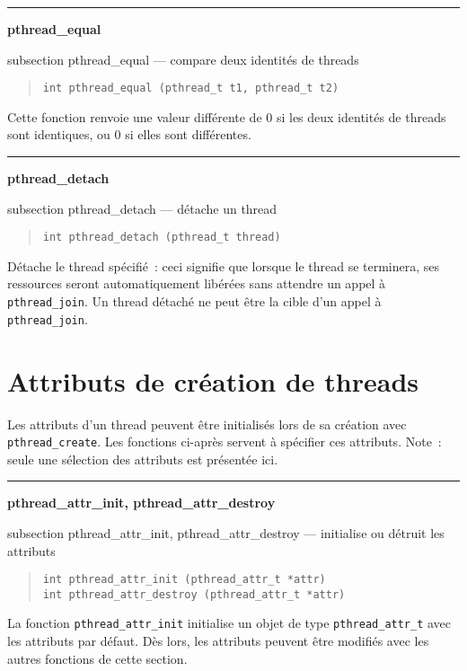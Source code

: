 \documentclass [twoside] {report}
\newcommand {\primitive} [1]
    {
	{\large \bf #1}
	\addcontentsline {toc} {subsection} {#1}
    }
\newcommand {\separation}
    {
	\vspace {7mm}
	\nopagebreak
	\hrule
    }
\begin{document}
\separation 
\primitive {pthread\_equal} --- compare deux identités de threads

\begin {quote}
\begin {verbatim}
int pthread_equal (pthread_t t1, pthread_t t2)
\end{verbatim}
\end {quote}

Cette fonction renvoie une valeur différente de 0 si les deux identités
de threads sont identiques, ou 0 si elles sont différentes.


\separation 
\primitive {pthread\_detach} --- détache un thread

\begin {quote}
\begin {verbatim}
int pthread_detach (pthread_t thread)
\end{verbatim}
\end {quote}

Détache le thread spécifié~: ceci signifie que lorsque le thread se
terminera, ses ressources seront automatiquement libérées sans attendre
un appel à \verb|pthread_join|. Un thread détaché ne peut être la
cible d'un appel à \verb|pthread_join|.


\section {Attributs de création de threads}

Les attributs d'un thread peuvent être initialisés lors de sa création
avec \verb|pthread_create|. Les fonctions ci-après servent à spécifier
ces attributs.
Note~: seule une sélection des attributs est présentée ici.


\separation
\primitive {pthread\_attr\_init, pthread\_attr\_destroy} --- initialise ou détruit les attributs

\begin {quote}
\begin {verbatim}
int pthread_attr_init (pthread_attr_t *attr)
int pthread_attr_destroy (pthread_attr_t *attr)
\end{verbatim}
\end {quote}

La fonction \verb|pthread_attr_init| initialise un objet de type
\verb|pthread_attr_t| avec les attributs par défaut. Dès lors, les
attributs peuvent être modifiés avec les autres fonctions de cette
section.
\end{document}
